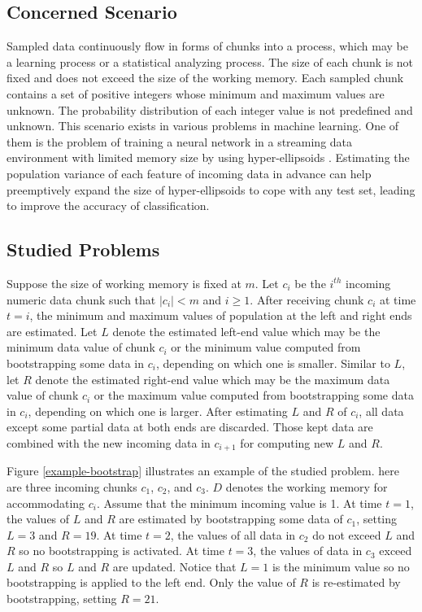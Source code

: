 \documentclass[a4paper,fleqn]{cas-dc}
\begin{document}
\subsection{Concerned Scenario}
\label{scenario}
Sampled data continuously flow in forms of chunks into a process, which may be a learning process or
a statistical analyzing process. The size of each chunk is
not fixed and does not exceed %
the size of the working memory. Each sampled chunk contains a set of positive
integers whose minimum and maximum values are unknown. The probability distribution of each integer value
is not predefined and unknown. This scenario exists in various problems in machine learning. One of them is 
the problem of training a neural network in a streaming data environment with limited memory size by using 
hyper-ellipsoids \cite{jun}. Estimating the population variance of each feature of incoming data in advance 
can help preemptively expand the size of hyper-ellipsoids to cope with any test set,
leading to improve the accuracy of classification.

\subsection{Studied Problems}
Suppose the size of working memory is fixed at $m$. Let $c_{i}$ be the $i^{th}$ incoming numeric data chunk 
such that $|c_{i}| < m$ and $i \geq 1$. After receiving chunk $c_{i}$ at time $t = i$, the minimum 
and maximum values of population at the left and right ends are estimated. Let $L$ denote the estimated 
left-end value which may be the minimum data value of chunk $c_{i}$ or the minimum value computed from 
bootstrapping some data in $c_{i}$, depending on which one is smaller. Similar to $L$, let $R$ denote the 
estimated right-end value which may be the maximum data value of chunk $c_{i}$ or the maximum value 
computed from bootstrapping some data in $c_{i}$, depending on which one is larger. After estimating $L$ 
and $R$ of $c_{i}$, all data except some partial data at both ends are discarded. Those kept data
are combined with the new incoming data in $c_{i+1}$ for computing new $L$ and $R$.

Figure \ref{example-bootstrap} illustrates an example of the studied problem.  here are three incoming
chunks $c_{1}$, $c_{2}$, and $c_{3}$. $D$ denotes the working memory for accommodating $c_{i}$. Assume that 
the minimum incoming value is 1. At time $t = 1$, the values of $L$ and $R$ are estimated by bootstrapping 
some data of $c_{1}$, setting $L = 3$ and $R = 19$. At time $t = 2$, the values of all data in $c_{2}$ do 
not exceed $L$ and $R$ so no bootstrapping is activated. At time $t = 3$, the values of data in $c_{3}$ 
exceed $L$ and $R$ so $L$ and $R$ are updated. Notice that $L = 1$ is the minimum value so 
no bootstrapping is applied to the left end. Only the value of $R$ is re-estimated by bootstrapping, 
setting $R = 21$.
\end{document}
